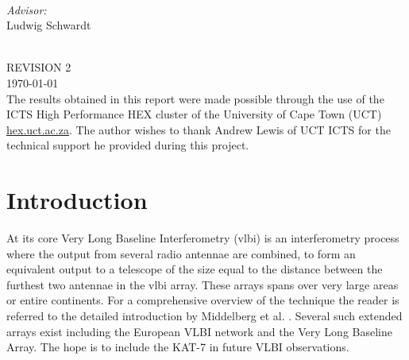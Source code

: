 \documentclass[a4paper,10pt]{article}
\begin{document}
\begin{titlepage}
\begin{minipage}{0.4\textwidth}
\begin{flushleft}
\end{flushleft}
\end{minipage}
~
\begin{minipage}{0.4\textwidth}
\begin{flushright} \large
\emph{Advisor:} \\
Ludwig Schwardt
\end{flushright}
\end{minipage}\\[3cm]


{\Large REVISION 2}\\[1.0cm] 
{\large \today}\\[1.5cm] %

{The results obtained in this report were made possible through the use of the ICTS High Performance HEX cluster 
of the University of Cape Town (UCT) \url{hex.uct.ac.za}. The author wishes to thank Andrew Lewis of UCT ICTS for 
the technical support he provided during this project.}


\vfill %

\end{titlepage}

\printglossary[style=long]
\pagebreak
\tableofcontents
\pagebreak
\listoffigures
\listoftables
\pagebreak
\section{Introduction}
At its core Very Long Baseline Interferometry (\gls{vlbi}) is an interferometry process where the output from several radio antennae are 
combined, to form an equivalent output to a telescope of the size equal to the distance between the furthest two antennae in the \gls{vlbi} array. These
arrays spans over very large areas or entire continents. For a comprehensive overview of the technique the reader is referred to the detailed introduction 
by Middelberg et al. \cite{middelberg2008high}. Several such extended arrays exist including the European VLBI network and the Very Long Baseline Array. The 
hope is to include the KAT-7 in future VLBI observations.
\end{document}
